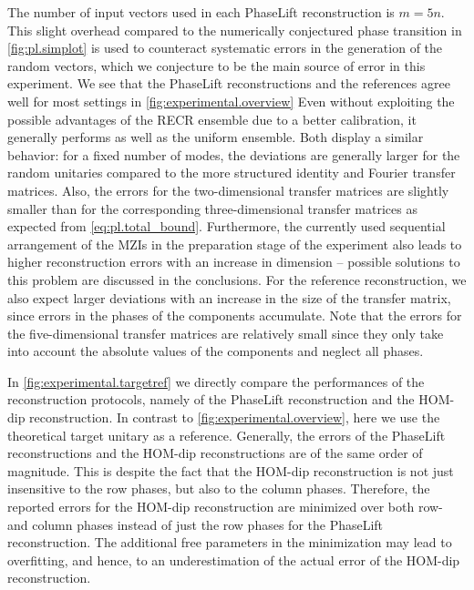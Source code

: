 The number of input vectors used in each PhaseLift reconstruction is $m = 5n$.
This slight overhead compared to the numerically conjectured phase transition in \cref{fig:pl.simplot} is used to counteract systematic errors in the generation of the random vectors, which we conjecture to be the main source of error in this experiment.
We see that the PhaseLift reconstructions and the references agree well for most settings in \cref{fig:experimental.overview}
Even without exploiting the possible advantages of the RECR ensemble due to a better calibration, it generally performs as well as the uniform ensemble.
Both display a similar behavior: for a fixed number of modes, the deviations are generally larger for the random unitaries compared to the more structured identity and Fourier transfer matrices.
Also, the errors for the two-dimensional transfer matrices are slightly smaller than for the corresponding three-dimensional transfer matrices as expected from \cref{eq:pl.total_bound}.
Furthermore, the currently used sequential arrangement of the MZIs in the preparation stage of the experiment also leads to higher reconstruction errors with an increase in dimension -- possible solutions to this problem are discussed in the conclusions.
For the reference reconstruction, we also expect larger deviations with an increase in the size of the transfer matrix, since errors in the phases of the components accumulate.
Note that the errors for the five-dimensional transfer matrices are relatively small since they only take into account the absolute values of the components and neglect all phases.

In \cref{fig:experimental.targetref} we directly compare the performances of the reconstruction protocols, namely of the PhaseLift reconstruction and the HOM-dip reconstruction.
In contrast to \cref{fig:experimental.overview}, here we use the theoretical target unitary as a reference.
Generally, the errors of the PhaseLift reconstructions and the HOM-dip reconstructions are of the same order of magnitude.
This is despite the fact that the HOM-dip reconstruction is not just insensitive to the row phases, but also to the column phases.
Therefore, the reported errors for the HOM-dip reconstruction are minimized over both row- and column phases instead of just the row phases for the PhaseLift reconstruction.
The additional free parameters in the minimization may lead to overfitting, and hence, to an underestimation of the actual error of the HOM-dip reconstruction.


